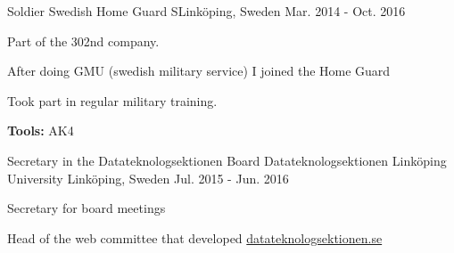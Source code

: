 

\begin{cventries}

  \cventry
    {Soldier} %
    {Swedish Home Guard} %
    {SLinköping, Sweden} %
    {Mar. 2014 - Oct. 2016} %
    {
      \begin{cvitems} %
        \item {Part of the 302nd company.}
        \item {After doing GMU (swedish military service) I joined the Home Guard}
        \item {Took part in regular military training.}
        \item {\textbf{Tools:} AK4}
      \end{cvitems}
    }

  \cventry
    {Secretary in the Datateknologsektionen Board} %
    {Datateknologsektionen Linköping University} %
    {Linköping, Sweden} %
    {Jul. 2015 - Jun. 2016} %
    {
      \begin{cvitems} %
        \item {Secretary for board meetings}
        \item {Head of the web committee that developed \href{https://d-sektionen.se/}{datateknologsektionen.se}}
      \end{cvitems}
    }

\end{cventries}
